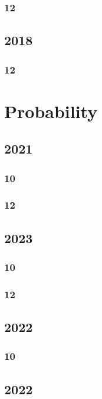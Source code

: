 \documentclass[11pt]{book}
\begin{document}
\subsection{12}


\section{2018}
\subsection{12}







\chapter{Probability}
\section{2021}
\subsection{10}

\subsection{12}

\section{2023}
\subsection{10}

\subsection{12}

\section{2022}
\subsection{10}

\section{2022}
\end{document}

